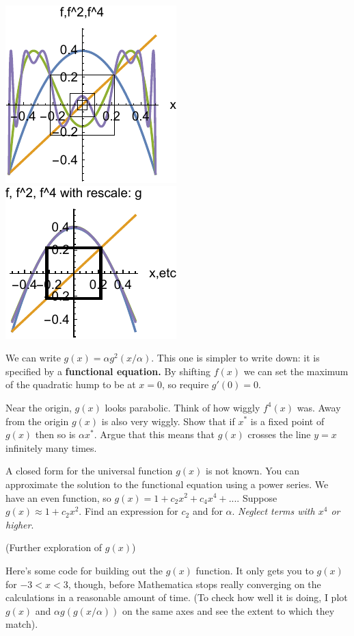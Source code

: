 \documentclass[12pt,letterpaper,noanswers]{exam}
\begin{document}
\begin{questions}
\begin{parts}
\includegraphics{img/20191113-C29p13a.pdf}
\includegraphics{img/20191113-C29p13b.pdf}

We can write $g(x) =  \alpha g^2(x/\alpha)$.  This one is simpler to write down: it is specified by a \textbf{functional equation.}
By shifting $f(x)$ we can set the maximum of the quadratic hump to be at $x = 0$, so require $g'(0) = 0$.

Near the origin, $g(x)$ looks parabolic.  Think of how wiggly $f^4(x)$ was.  Away from the origin $g(x)$ is also very wiggly.  Show that if $x^*$ is a fixed point of $g(x)$ then so is $\alpha x^*$.  Argue that this means that $g(x)$ crosses the line $y=x$ infinitely many times.

\end{parts}

\question A closed form for the universal function $g(x)$ is not known.   You can approximate the solution to the functional equation using a power series.  We have an even function, so $g(x) = 1+c_2x^2+c_4x^4+...$.  Suppose $g(x) \approx 1+c_2x^2$.  Find an expression for $c_2$ and for $\alpha$.  \emph{Neglect terms with $x^4$ or higher}.

\question (Further exploration of $g(x)$) 

Here's some code for building out the $g(x)$ function.  It only gets you to $g(x)$ for $-3<x<3$, though, before Mathematica stops really converging on the calculations in a reasonable amount of time.  (To check how well it is doing, I plot $g(x)$ and $\alpha g(g(x/\alpha))$ on the same axes and see the extent to which they match).


\end{questions}
\end{document}
